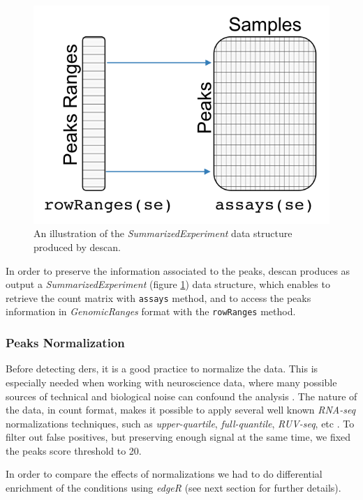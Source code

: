 \begin{figure}[H]
\centering
\includegraphics[scale=.7]{img/descan2/counts.png}
\caption[\gls{descan} counts illustration]{An illustration of the \textit{SummarizedExperiment} data structure produced by \gls{descan}.}
\label{fig:countsdescan}
\centering
\end{figure}

In order to preserve the information associated to the peaks, \gls{descan} produces as output a \textit{SummarizedExperiment} (figure \ref{fig:countsdescan}) data structure, which enables to retrieve the count matrix with \lstinline!assays! method, and to access the peaks information in \textit{GenomicRanges} format with the \lstinline!rowRanges! method.


\subsubsection{Peaks Normalization}

Before detecting \glspl{der}, it is a good practice to normalize the data.
This is especially needed when working with neuroscience data, where many possible sources of technical and biological noise can confound the analysis \cite{Peixoto2015}.
The nature of the data, in count format, makes it possible to apply several well known \textit{RNA-seq} normalizations techniques, such as \textit{upper-quartile}, \textit{full-quantile}, \textit{RUV-seq}, etc \cite{Risso2014h, Dillies2013}.
To filter out false positives, but preserving enough signal at the same time, we fixed the peaks score threshold to 20.

In order to compare the effects of normalizations we had to do differential enrichment of the conditions using \textit{edgeR} (see next section for further details).

